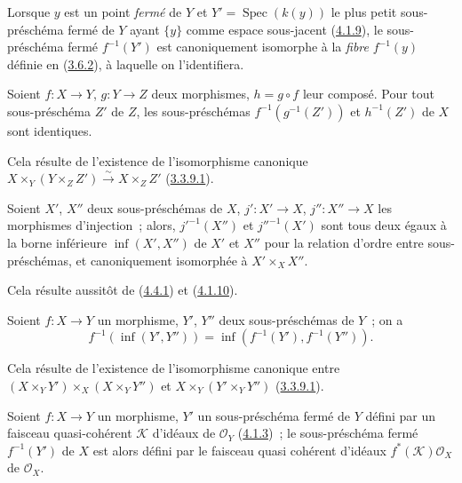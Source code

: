Lorsque $y$ est un point \emph{fermé} de $Y$ et
$Y'=\operatorname{Spec}(k(y))$ le plus petit sous-préschéma fermé de $Y$ ayant
$\{y\}$ comme espace sous-jacent (\hyperref[I.4.1.9-fr]{4.1.9}), le
sous-préschéma fermé $f^{-1}(Y')$ est canoniquement isomorphe à la
\emph{fibre} $f^{-1}(y)$ définie en (\hyperref[I.3.6.2-fr]{3.6.2}), à
laquelle on l'identifiera.

\begin{corollary}[4.4.2]
\label{I.4.4.2-fr}
Soient $f:X\to Y$, $g:Y\to Z$ deux morphismes, $h=g\circ f$ leur composé.
Pour tout sous-préschéma $Z'$ de $Z$, les sous-préschémas
$f^{-1}(g^{-1}(Z'))$ et $h^{-1}(Z')$ de $X$ sont identiques.
\end{corollary}

Cela résulte de l'existence de l'isomorphisme canonique
$X\times_Y(Y\times_Z Z')\xrightarrow{\sim}X\times_Z Z'$
(\hyperref[I.3.3.9.1-fr]{3.3.9.1}).

\begin{corollary}[4.4.3]
\label{I.4.4.3-fr}
Soient $X'$, $X''$ deux sous-préschémas de $X$, $j':X'\to X$,
$j'':X''\to X$ les morphismes d'injection~; alors, ${j'}^{-1}(X'')$ et
${j''}^{-1}(X')$ sont tous deux égaux à la borne inférieure
$\inf(X',X'')$ de $X'$ et $X''$ pour la relation d'ordre entre
sous-préschémas, et canoniquement isomorphée à $X'\times_X X''$.
\end{corollary}

Cela résulte aussitôt de (\hyperref[I.4.4.1-fr]{4.4.1}) et
(\hyperref[I.4.1.10-fr]{4.1.10}).

\begin{corollary}[4.4.4]
\label{I.4.4.4-fr}
Soient $f:X\to Y$ un morphisme, $Y'$, $Y''$ deux sous-préschémas de $Y$~;
on a
\[
  f^{-1}(\inf(Y',Y''))=\inf(f^{-1}(Y'),f^{-1}(Y'')).
\]
\end{corollary}

Cela résulte de l'existence de l'isomorphisme canonique entre
$(X\times_Y Y')\times_X(X\times_Y Y'')$ et
$X\times_Y(Y'\times_Y Y'')$ (\hyperref[I.3.3.9.1-fr]{3.3.9.1}).

\begin{proposition}[4.4.5]
\label{I.4.4.5-fr}
Soient $f:X\to Y$ un morphisme, $Y'$ un sous-préschéma fermé de $Y$ défini
par un faisceau quasi-cohérent $\mathscr{K}$ d'idéaux de $\mathscr{O}_Y$
(\hyperref[I.4.1.3-fr]{4.1.3})~; le sous-préschéma fermé $f^{-1}(Y')$ de $X$
est alors défini par le faisceau quasi cohérent d'idéaux
$f^*(\mathscr{K})\mathscr{O}_X$ de $\mathscr{O}_X$.
\end{proposition}

